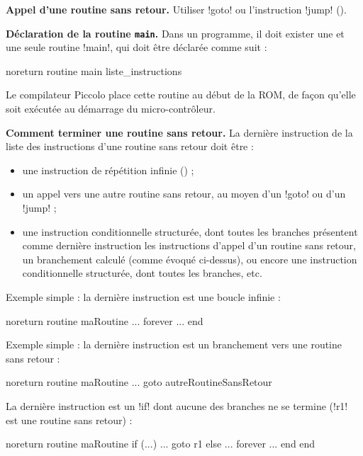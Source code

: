 \textbf{Appel d’une routine sans retour.} Utiliser \pic!goto! ou l'instruction \pic!jump! ().


\textbf{Déclaration de la routine \texttt{main}.} Dans un programme, il doit exister une et une seule routine \pic!main!, qui doit être déclarée comme suit :

\begin{piccolo}
noreturn routine main {
   liste_instructions
}
\end{piccolo}

Le compilateur Piccolo place cette routine au début de la ROM, de façon qu'elle soit exécutée au démarrage du micro-contrôleur.


\textbf{Comment terminer une routine sans retour.} La dernière instruction de la liste des instructions d’une routine sans retour doit être :
\begin{itemize}
  \item une instruction de répétition infinie () ;
  \item un appel vers une autre routine sans retour, au moyen d’un \pic!goto! ou d'un \pic!jump! ;
  \item une instruction conditionnelle structurée, dont toutes les branches présentent comme dernière instruction les instructions d’appel d’un routine sans retour, un branchement calculé (comme évoqué ci-dessus), ou encore une instruction conditionnelle structurée, dont toutes les branches, etc.

\end{itemize}

Exemple simple : la dernière instruction est une boucle infinie :
\begin{piccolo}
noreturn routine maRoutine {
  ...
  forever
    ...
  end
}
\end{piccolo}

Exemple simple : la dernière instruction est un branchement vers une routine sans retour :
\begin{piccolo}
noreturn routine maRoutine {
  ...
  goto autreRoutineSansRetour
}
\end{piccolo}


La dernière instruction est un \pic!if! dont aucune des branches ne se termine (\pic!r1! est une routine sans retour) :
\begin{piccolo}
noreturn routine maRoutine {
  if (...)
    ...
    goto r1
  else
    ...
    forever
      ...
    end
  end
}

\end{piccolo}


